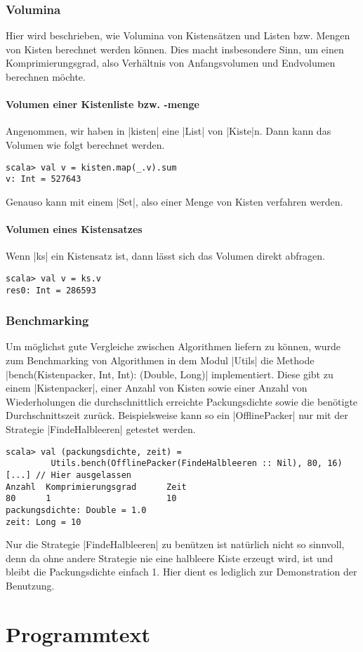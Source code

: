 \subsubsection{Volumina}
 Hier wird beschrieben, wie Volumina von Kistensätzen und Listen bzw. Mengen von Kisten berechnet werden können.
 Dies macht insbesondere Sinn, um einen Komprimierungsgrad, also Verhältnis von Anfangsvolumen und Endvolumen berechnen möchte.

\paragraph{Volumen einer Kistenliste bzw. -menge}
 Angenommen, wir haben in |kisten| eine |List| von |Kiste|n. Dann kann das Volumen wie folgt berechnet werden.
\begin{lstlisting}
scala> val v = kisten.map(_.v).sum
v: Int = 527643
\end{lstlisting}
 Genauso kann mit einem |Set|, also einer Menge von Kisten verfahren werden.
\paragraph{Volumen eines Kistensatzes}
 Wenn |ks| ein Kistensatz ist, dann lässt sich das Volumen direkt abfragen.
\begin{lstlisting}
scala> val v = ks.v
res0: Int = 286593
\end{lstlisting}
\subsubsection{Benchmarking}
Um möglichst gute Vergleiche zwischen Algorithmen liefern zu können,
wurde zum Benchmarking von Algorithmen in dem Modul |Utils| die Methode |bench(Kistenpacker, Int, Int): (Double, Long)| implementiert.
Diese gibt zu einem |Kistenpacker|,
einer Anzahl von Kisten sowie einer Anzahl von Wiederholungen die durchschnittlich erreichte Packungsdichte sowie die benötigte Durchschnittszeit zurück.
Beispielsweise kann so ein |OfflinePacker| nur mit der Strategie |FindeHalbleeren| getestet werden.
\begin{lstlisting}
scala> val (packungsdichte, zeit) =
         Utils.bench(OfflinePacker(FindeHalbleeren :: Nil), 80, 16)
[...] // Hier ausgelassen
Anzahl  Komprimierungsgrad      Zeit
80      1                       10
packungsdichte: Double = 1.0
zeit: Long = 10
\end{lstlisting}
 Nur die Strategie |FindeHalbleeren| zu benützen ist natürlich nicht so sinnvoll,
  denn da ohne andere Strategie nie eine halbleere Kiste erzeugt wird, ist und bleibt die Packungsdichte einfach 1.
 Hier dient es lediglich zur Demonstration der Benutzung.
\section{Programmtext}
\label{code1}
